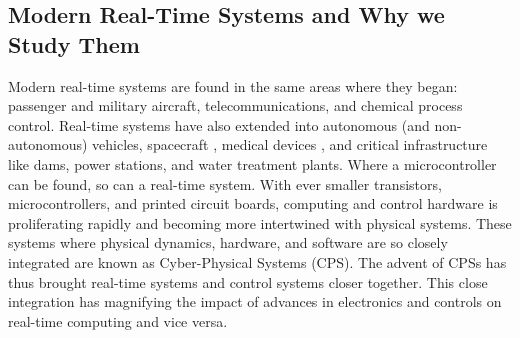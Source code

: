 \subsection{Modern Real-Time Systems and Why we Study Them}


Modern real-time systems are found in the same areas where they began: passenger and military aircraft, telecommunications, and chemical process control.
Real-time systems have also extended into autonomous (and non-autonomous) vehicles, spacecraft \cite{vavra_real-time_2018}, medical devices \cite{jiang_real-time_2010}, and critical infrastructure like dams, power stations, and water treatment plants.
Where a microcontroller can be found, so can a real-time system.
With ever smaller transistors, microcontrollers, and printed circuit boards, computing and control hardware is proliferating rapidly and becoming more intertwined with physical systems.
These systems where physical dynamics, hardware, and software are so closely integrated are known as Cyber-Physical Systems (CPS).
The advent of CPSs has thus brought real-time systems and control systems closer together.
This close integration has magnifying the impact of advances in electronics and controls on real-time computing and vice versa.


